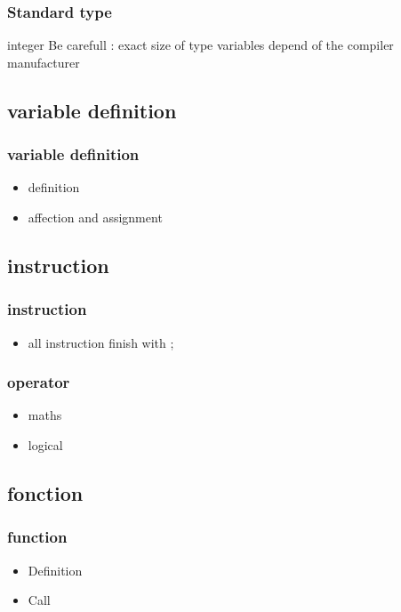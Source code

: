 \documentclass{beamer}
\begin{document}
\begin{frame}
  \frametitle{Standard type}
  \begin{block}{integer}
	  Be carefull : exact size of type variables depend of the compiler manufacturer  
  \end{block}
\end{frame}

\subsection{variable definition}
\label{sub:variable_definition}

\begin{frame}
  \frametitle{variable definition}
	\begin{itemize}
		\item definition
		\item affection and assignment
	\end{itemize}
\end{frame}

\subsection{instruction}
\label{sub:instruction}

\begin{frame}
  \frametitle{instruction}
	\begin{itemize}
		\item all instruction finish with ;
	\end{itemize}
\end{frame}

\begin{frame}
  \frametitle{operator}
	\begin{itemize}
		\item maths
		\item logical
	\end{itemize}
\end{frame}

\subsection{fonction}
\label{sub:fonction}

\begin{frame}
  \frametitle{function}
	\begin{itemize}
		\item Definition
		\item Call
	\end{itemize}
\end{frame}
\end{document}
